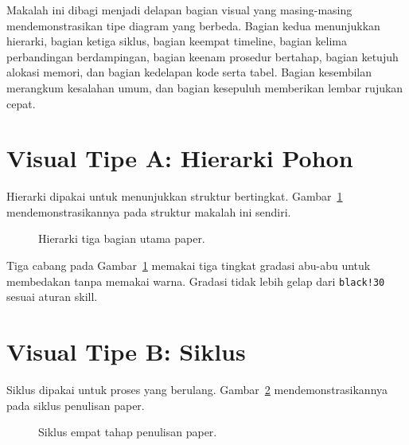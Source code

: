 \documentclass[11pt,a4paper]{article}
\begin{document}
Makalah ini dibagi menjadi delapan bagian visual yang masing-masing mendemonstrasikan tipe diagram yang berbeda. Bagian kedua menunjukkan hierarki, bagian ketiga siklus, bagian keempat timeline, bagian kelima perbandingan berdampingan, bagian keenam prosedur bertahap, bagian ketujuh alokasi memori, dan bagian kedelapan kode serta tabel. Bagian kesembilan merangkum kesalahan umum, dan bagian kesepuluh memberikan lembar rujukan cepat.

\section{Visual Tipe A: Hierarki Pohon}

Hierarki dipakai untuk menunjukkan struktur bertingkat. Gambar~\ref{fig:hierarchy} mendemonstrasikannya pada struktur makalah ini sendiri.

\begin{figure}[H]
	\centering
	\caption{Hierarki tiga bagian utama paper.}
	\label{fig:hierarchy}
\end{figure}

Tiga cabang pada Gambar~\ref{fig:hierarchy} memakai tiga tingkat gradasi abu-abu untuk membedakan tanpa memakai warna. Gradasi tidak lebih gelap dari \texttt{black!30} sesuai aturan skill.

\section{Visual Tipe B: Siklus}

Siklus dipakai untuk proses yang berulang. Gambar~\ref{fig:cycle} mendemonstrasikannya pada siklus penulisan paper.

\begin{figure}[H]
	\centering
	\caption{Siklus empat tahap penulisan paper.}
	\label{fig:cycle}
\end{figure}
\end{document}
